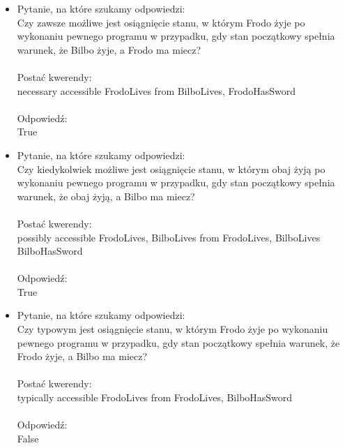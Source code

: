 \documentclass[11pt,a4paper]{article}
\begin{document}
\begin{itemize}
\item Pytanie, na które szukamy odpowiedzi: \\
Czy zawsze możliwe jest osiągnięcie stanu, w którym Frodo żyje po wykonaniu pewnego programu w przypadku, gdy stan początkowy spełnia warunek, że Bilbo żyje, a Frodo ma miecz? \\ \\
Postać kwerendy: \\
necessary accessible FrodoLives from BilboLives, FrodoHasSword \\ \\
Odpowiedź: \\
True


\item Pytanie, na które szukamy odpowiedzi: \\
Czy kiedykolwiek możliwe jest osiągnięcie stanu, w którym obaj żyją po wykonaniu pewnego programu w przypadku, gdy stan początkowy spełnia warunek, że obaj żyją, a Bilbo ma miecz? \\ \\
Postać kwerendy: \\
possibly accessible FrodoLives, BilboLives from FrodoLives, BilboLives BilboHasSword \\ \\
Odpowiedź: \\
True


\item Pytanie, na które szukamy odpowiedzi: \\
Czy typowym jest osiągnięcie stanu, w którym Frodo żyje po wykonaniu pewnego programu w przypadku, gdy stan początkowy spełnia warunek, że Frodo żyje, a Bilbo ma miecz? \\ \\
Postać kwerendy: \\
typically accessible FrodoLives from FrodoLives, BilboHasSword \\ \\
Odpowiedź: \\
False 
\end{itemize}
\end{document}
